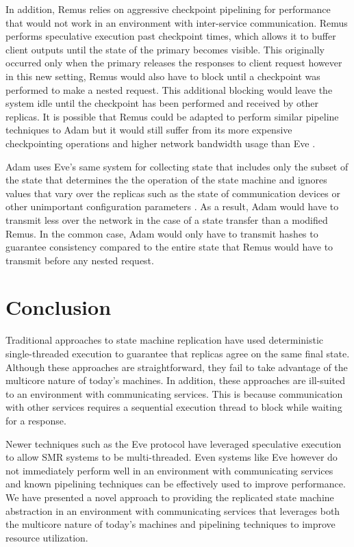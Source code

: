 \documentclass[11pt, oneside]{report}
\begin{document}
In addition, Remus relies on aggressive checkpoint pipelining for performance that would not work in an environment with inter-service communication.
Remus performs speculative execution past checkpoint times, which allows it to buffer client outputs until the state of the primary becomes visible. This originally occurred only when the primary releases the responses to client request however in this new setting, Remus would also have to block until a checkpoint was performed to make a nested request. 
This additional blocking would leave the system idle until the checkpoint has been performed and received by other replicas.
It is possible that Remus could be adapted to perform similar pipeline techniques to Adam but it would still suffer from its more expensive checkpointing operations and higher network bandwidth usage than Eve \cite{eve}. 

Adam uses Eve's same system for collecting state that includes only the subset of the state that determines the the operation of the state machine and ignores values that vary over the replicas such as the state of communication devices or other unimportant configuration parameters \cite{manosThesis}.
As a result, Adam would have to transmit less over the network in the case of a state transfer than a modified Remus.
In the common case, Adam would only have to transmit hashes to guarantee consistency compared to the entire state that Remus would have to transmit before any nested request.

\chapter{Conclusion}\label{Conclusion}

Traditional approaches to state machine replication have used deterministic single-threaded execution to guarantee that replicas agree on the same final state. Although these approaches are straightforward, they fail to take advantage of the multicore nature of today's machines. 
In addition, these approaches are ill-suited to an environment with communicating services. This is because communication with other services requires a sequential execution thread to block while waiting for a response. 

Newer techniques such as the Eve protocol \cite{eve} have leveraged speculative execution to allow SMR systems to be multi-threaded.
Even systems like Eve however do not immediately perform well in an environment with communicating services and known pipelining techniques can be effectively used to improve performance.
We have presented a novel approach to providing the replicated state machine abstraction in an environment with communicating services that leverages both the multicore nature of today's machines and pipelining techniques to improve resource utilization. 
\end{document}
